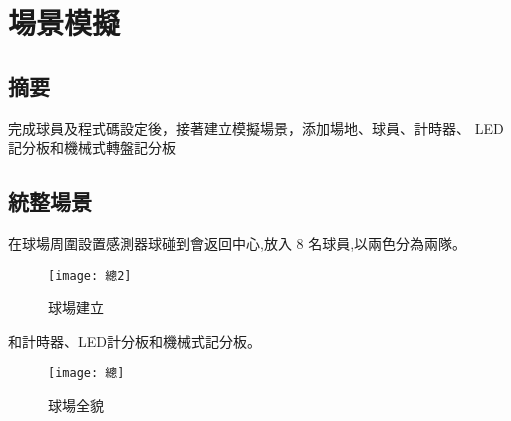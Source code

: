\chapter{場景模擬}
\renewcommand{\baselinestretch}{10.0} %
\setcounter{page}{7}  %
\fontsize{14pt}{2.5pt}\sectionef
\section{摘要}
  完成球員及程式碼設定後，接著建立模擬場景，添加場地、球員、計時器、 LED 記分板和機械式轉盤記分板\\
\section{統整場景}
  在球場周圍設置感測器球碰到會返回中心,放入 8 名球員,以兩色分為兩隊。\\
\begin{figure}[hbt!]
\begin{center}
\texttt{[image: 總2]}
\caption{\Large 球場建立}\label{總2}
\end{center}
\end{figure}

  和計時器、LED計分板和機械式記分板。\\
\begin{figure}[hbt!]
\begin{center}
\texttt{[image: 總]}
\caption{\Large 球場全貌}\label{總}
\end{center}
\end{figure}
\renewcommand{\baselinestretch}{1} %
